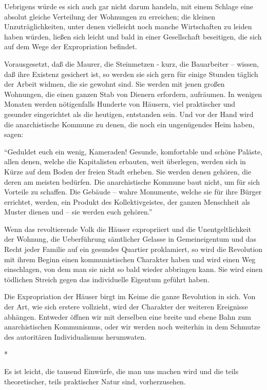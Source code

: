 \documentclass{scrbook}
\begin{document}
Uebrigens würde es sich auch gar nicht darum handeln, mit einem Schlage eine absolut gleiche Verteilung der Wohnungen zu erreichen; die kleinen Unzuträglichkeiten, unter denen vielleicht noch manche Wirtschaften zu leiden haben würden, ließen sich leicht und bald in einer Gesellschaft beseitigen, die sich auf dem Wege der Expropriation befindet.

Vorausgesetzt, daß die Maurer, die Steinmetzen - kurz, die Bauarbeiter – wissen, daß ihre Existenz gesichert ist, so werden sie sich gern für einige Stunden täglich der Arbeit widmen, die sie gewohnt sind. Sie werden mit jenen großen Wohnungen, die einen ganzen Stab von Dienern erfordern, aufräumen. In wenigen Monaten werden nötigenfalls Hunderte von Häusern, viel praktischer und gesunder eingerichtet als die heutigen, entstanden sein. Und vor der Hand wird die anarchistische Kommune zu denen, die noch ein ungenügendes Heim haben, sagen:

``Geduldet euch ein wenig, Kameraden! Gesunde, komfortable und schöne Paläste, allen denen, welche die Kapitalisten erbauten, weit überlegen, werden sich in Kürze auf dem Boden der freien Stadt erheben. Sie werden denen gehören, die deren am meisten bedürfen. Die anarchistische Kommune baut nicht, um für sich Vorteile zu schaffen. Die Gebäude – wahre Monumente, welche sie für ihre Bürger errichtet, werden, ein Produkt des Kollektivgeistes, der ganzen Menschheit als Muster dienen und – sie werden euch gehören.''

Wenn das revoltierende Volk die Häuser expropriiert und die Unentgeltlichkeit der Wohnung, die Ueberführung sämtlicher Gelasse in Gemeineigentum und das Recht jeder Familie auf ein gesundes Quartier proklamiert, so wird die Revolution mit ihrem Beginn einen kommunistischen Charakter haben und wird einen Weg einschlagen, von dem man sie nicht so bald wieder abbringen kann. Sie wird einen tödlichen Streich gegen das individuelle Eigentum geführt haben.

Die Expropriation der Häuser birgt im Keime die ganze Revolution in sich. Von der Art, wie sich erstere vollzieht, wird der Charakter der weiteren Ereignisse abhängen. Entweder öffnen wir mit derselben eine breite und ebene Bahn zum anarchistischen Kommunismus, oder wir werden noch weiterhin in dem Schmutze des autoritären Individualismus herumwaten.

\begin{center}*\end{center}

Es ist leicht, die tausend Einwürfe, die man uns machen wird und die teils theoretischer, teils praktischer Natur sind, vorherzusehen.
\end{document}
